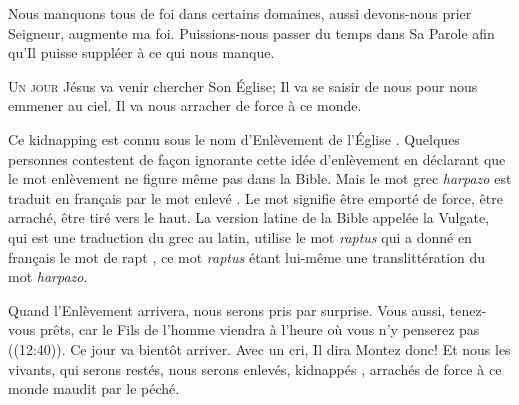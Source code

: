 Nous manquons tous de foi dans certains domaines, aussi devons-nous prier\frcolon {}
 \Og Seigneur, augmente ma foi. \Fg{}
 Puissions-nous passer du temps dans Sa Parole afin qu'Il puisse
 suppléer à ce qui nous manque.

\dvrule






\lettrine{U}{n jour} Jésus va venir chercher Son Église;
 Il va se saisir de nous pour nous emmener au ciel.
 Il va nous arracher de force à ce monde.

Ce \Og kidnapping \Fg{} est connu sous le nom \Og d'Enlèvement de l'Église \Fg{}.
 Quelques personnes contestent de fa\c{c}on ignorante cette idée d'enlèvement
 en déclarant que le mot \Og enlèvement \Fg{} ne figure même pas dans la Bible.
 Mais le mot grec \emph{harpazo} est traduit en fran\c{c}ais
 par le mot \Og enlevé \Fg{}. Le mot signifie \Og être emporté de force,
 être arraché, être tiré vers le haut. \Fg{}
 La version latine de la Bible appelée la Vulgate, qui est une traduction
 du grec au latin,  utilise
 le mot \emph{raptus} qui a donné en fran\c{c}ais le mot de \Og rapt \Fg{},
 ce mot \emph{raptus} étant lui-même une translittération du mot \emph{harpazo}. 


Quand l'Enlèvement arrivera, nous serons pris par surprise.
 \Og Vous aussi, tenez-vous prêts, car le Fils de l'homme viendra à l'heure
 où vous n'y penserez pas \Fg{}  ((12:40)).
 Ce jour va bientôt arriver. Avec un cri, Il dira\frcolon {}
 \Og Montez donc! \Fg{} Et nous les vivants, qui serons restés,
 nous serons enlevés, \Og kidnappés \Fg{}, arrachés de force
 à ce monde maudit par le péché.

